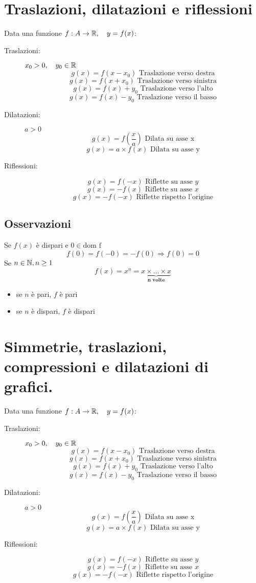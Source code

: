 \section{Traslazioni, dilatazioni e riflessioni}
Data una funzione $f: A \rightarrow \mathbb{R} , \quad y=f(x)$:
\begin{description}
	\item[Traslazioni:] $x_0 > 0, \quad y_0 \in \mathbb{R}$
		\[g(x)=f(x-x_0) \text{ Traslazione verso destra}\]
		\[g(x)=f(x+x_0) \text{ Traslazione verso sinistra}\]
		\[g(x)=f(x)+y_0 \text{ Traslazione verso l'alto}\]
		\[g(x)=f(x)-y_0 \text{ Traslazione verso il basso}\]
	\item[Dilatazioni:] $a>0$
		\[g(x)=f(\frac{x}{a}) \text{ Dilata su asse x}\]
		\[g(x)=a\times f(x) \text{ Dilata su asse y}\]
	\item[Riflessioni:]
		\[g(x)=f(-x) \text{ Riflette su asse }y\]
		\[g(x)=-f(x) \text{ Riflette su asse }x\]
		\[g(x)=-f(-x) \text{ Riflette rispetto l'origine}\]
\end{description}


\subsection{Osservazioni}
Se $f(x)$ è dispari e $0 \in \text{dom f}$
\[f(0)=f(-0)=-f(0)\Rightarrow f(0)=0\]
\newline
Se $n \in \mathbb{N}, n \geq 1$
\[f(x)=x^n= \underbrace{x \times \dots \times x}_{\textbf{n volte}}\]
\begin{itemize}
	\item se $n$ è pari, $f$ è pari
	\item se $n$ è dispari, $f$ è dispari
\end{itemize}

\section{Simmetrie, traslazioni, compressioni e dilatazioni di grafici.}
Data una funzione $f: A \rightarrow \mathbb{R} , \quad y=f(x)$:
\begin{description}
	\item[Traslazioni:] $x_0 > 0, \quad y_0 \in \mathbb{R}$
		\[g(x)=f(x-x_0) \text{ Traslazione verso destra}\]
		\[g(x)=f(x+x_0) \text{ Traslazione verso sinistra}\]
		\[g(x)=f(x)+y_0 \text{ Traslazione verso l'alto}\]
		\[g(x)=f(x)-y_0 \text{ Traslazione verso il basso}\]
	\item[Dilatazioni:] $a>0$
		\[g(x)=f(\frac{x}{a}) \text{ Dilata su asse x}\]
		\[g(x)=a\times f(x) \text{ Dilata su asse y}\]
	\item[Riflessioni:]
		\[g(x)=f(-x) \text{ Riflette su asse }y\]
		\[g(x)=-f(x) \text{ Riflette su asse }x\]
		\[g(x)=-f(-x) \text{ Riflette rispetto l'origine}\]
\end{description}

